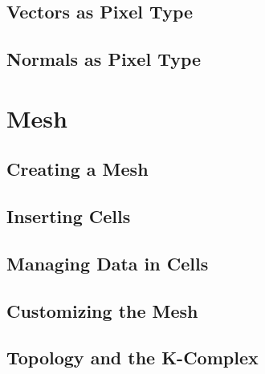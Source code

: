 \subsection{Vectors as Pixel Type}
\label{sec:PointSetWithVectorsAsPixelType}

%



\subsection{Normals as Pixel Type}
\label{sec:PointSetWithCovariantVectorsAsPixelType}

%




\section{Mesh}\label{MeshSection}

\subsection{Creating a Mesh}
\label{sec:CreatingAMesh}

%


\subsection{Inserting Cells}
\label{sec:InsertingCellsInMesh}

%


\subsection{Managing Data in Cells}
\label{sec:ManagingCellDataInMesh}

%


\subsection{Customizing the Mesh}
\label{sec:CustomizingTheMesh}

%


\subsection{Topology and the K-Complex}
\label{sec:MeshKComplex}

